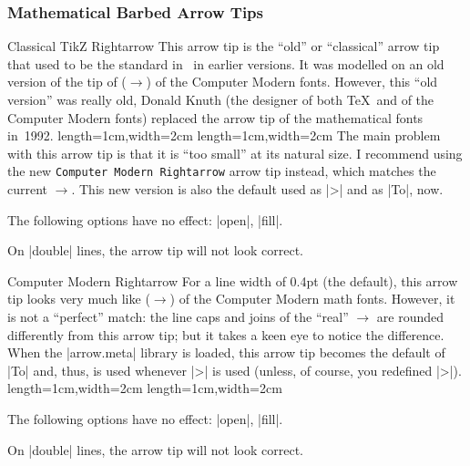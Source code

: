 \subsubsection{Mathematical Barbed Arrow Tips}


\begin{arrowtip}{Classical TikZ Rightarrow}
  {
    This arrow tip is the ``old'' or ``classical'' arrow tip that used
    to be the standard in \tikzname\ in earlier versions. It was
    modelled on an old version of the tip of \texttt{\string\rightarrow}
    ($\rightarrow$) of the Computer Modern fonts. However, this ``old
    version'' was really old, Donald 
    Knuth (the designer of both \TeX\ and of the Computer Modern
    fonts) replaced the arrow tip of the mathematical fonts
    in~1992. 
  }
  {length=1cm,width=2cm}
  {length=1cm,width=2cm}
  The main problem with this arrow tip is that it is ``too small''
  at its natural size. I recommend using the new \texttt{Computer Modern
    Rightarrow} arrow tip instead, which matches the current
  $\to$. This new version is also the default used as |>| and as
  |To|, now.
  
  \begin{arrowexamples}
    \arrowexample[]
    \arrowexampledup[sep]
    \arrowexampledupdot[sep]
    \arrowexample[length=3pt]
    \arrowexample[sharp]
    \arrowexample[slant=.3]
    \arrowexample[left]
    \arrowexample[right]
    \arrowexample[red]
  \end{arrowexamples}
  The following options have no effect: |open|, |fill|.

  On |double| lines, the arrow tip will not look correct.
\end{arrowtip}

\begin{arrowtip}{Computer Modern Rightarrow}
  {
    For a line width of 0.4pt (the default), this arrow tip looks very
    much like \texttt{\string\rightarrow} ($\to$) of the Computer Modern math
    fonts. However, it is not a ``perfect'' match: the line caps and
    joins of the ``real'' $\to$ are rounded differently from this
    arrow tip; but it takes a keen eye to notice the difference. When
    the |arrow.meta| library is loaded, this arrow tip becomes the
    default of |To| and, thus, is used whenever |>| is used (unless,
    of course, you redefined |>|).
  }
  {length=1cm,width=2cm}
  {length=1cm,width=2cm}
  
  \begin{arrowexamples}
    \arrowexample[]
    \arrowexampledup[sep]
    \arrowexampledupdot[sep]
    \arrowexample[length=3pt]
    \arrowexample[sharp]
    \arrowexample[slant=.3]
    \arrowexample[left]
    \arrowexample[right]
    \arrowexample[red]
  \end{arrowexamples}
  The following options have no effect: |open|, |fill|.

  On |double| lines, the arrow tip will not look correct.
\end{arrowtip}



